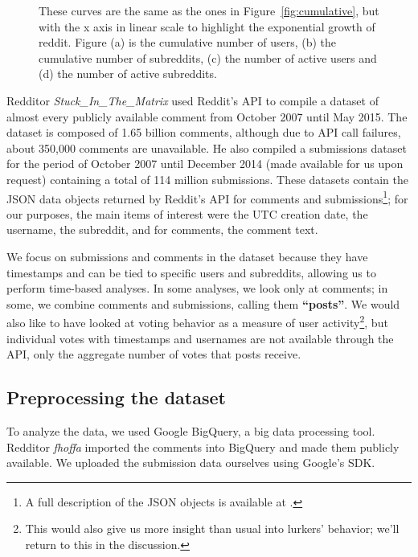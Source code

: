 \begin{figure}[!tb]
\centering
{}
\caption{These curves are the same as the ones in Figure~\ref{fig:cumulative}, but with the x axis in linear scale to highlight the exponential growth of reddit. Figure (a) is the cumulative number of users, (b) the cumulative number of subreddits, (c) the number of active users and (d) the number of active subreddits.}
\label{fig:cumulative_linear}
\end{figure}

Redditor \textit{Stuck\_In\_The\_Matrix} used Reddit's API to compile a dataset of almost every publicly available comment\cite{RedditDataset1} from October 2007 until May 2015.  The dataset is composed of 1.65 billion comments, although due to API call failures, about 350,000 comments are unavailable.  He also compiled a submissions dataset for the period of October 2007 until December 2014 (made available for us upon request) containing a total of 114 million submissions.  These datasets contain the JSON data objects returned by Reddit's API for comments and submissions\footnote{A full description of the JSON objects is available at \cite{RedditAPI}.}; for our purposes, the main items of interest were the UTC creation date, the username, the subreddit, and for comments, the comment text.

We focus on submissions and comments in the dataset because they have timestamps and can be tied to specific users and subreddits, allowing us to perform time-based analyses.   In some analyses, we look only at comments; in some, we combine comments and submissions, calling them \textbf{``posts''}.  We would also like to have looked at voting behavior as a measure of user activity\footnote{This would also give us more insight than usual into lurkers' behavior; we'll return to this in the discussion.}, but individual votes with timestamps and usernames are not available through the API, only the aggregate number of votes that posts receive.

\subsection{Preprocessing the dataset}

To analyze the data, we used Google BigQuery\cite{BigQuery}, a big data processing tool.
Redditor \textit{fhoffa} imported the comments into BigQuery and made them publicly available\cite{RedditDataset2}.  We uploaded the submission data ourselves using Google's SDK.

